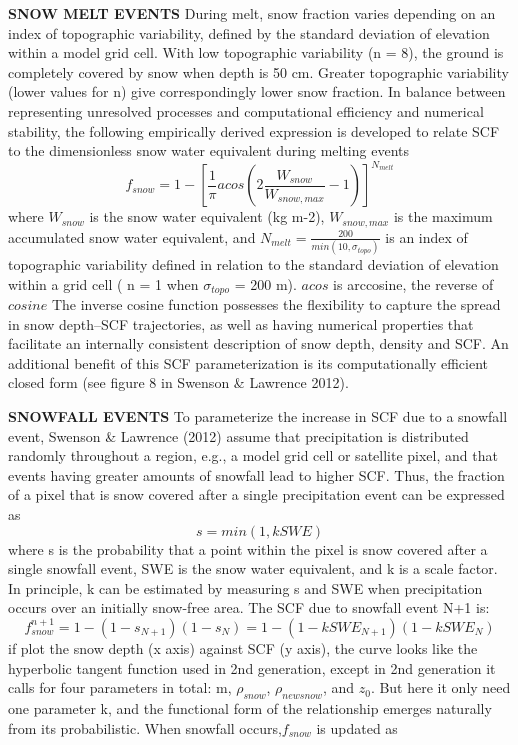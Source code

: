 \documentclass[twoside,10pt]{report}
\begin{document}
\textbf{SNOW MELT EVENTS}
During melt, snow fraction varies depending on an index of topographic variability, defined by the standard deviation of elevation within a model grid cell. With low topographic variability (n = 8), the ground is completely covered by snow when depth is 50 cm. Greater topographic variability (lower values for n) give correspondingly lower snow fraction.
In balance between representing unresolved processes and computational efficiency and numerical stability, the following empirically derived expression is developed to relate SCF to the dimensionless snow water equivalent during melting events
\begin{equation}
f_{snow}=1 - [ \frac{1}{\pi} acos (2\frac{W_{snow}}{W_{snow,max}}  - 1) ]^{N_{melt}} 
\end{equation}
where $W_{snow}$ is the snow water equivalent (kg m-2), $W_{snow,max}$ is the maximum accumulated snow water equivalent, and $N_{melt} = \frac{200}{min(10,\sigma_{topo})}$ is an index of topographic variability defined in relation to the standard deviation of elevation within a grid cell ( n = 1 when $\sigma_{topo}$ = 200 m). $acos$ is arccosine, the reverse of $cosine$ 
The inverse cosine function possesses the flexibility to capture the spread in snow depth–SCF trajectories, as well as having numerical properties that facilitate an internally consistent description of snow depth, density and SCF. An additional benefit of this SCF parameterization is its computationally efficient closed form (see figure 8 in Swenson \& Lawrence 2012).

\textbf{SNOWFALL EVENTS}
To parameterize the increase in SCF due to a snowfall event, Swenson \& Lawrence (2012) assume that precipitation is distributed randomly throughout a region, e.g., a model grid cell or satellite pixel, and that events having greater amounts of snowfall lead to higher SCF. Thus, the fraction of a pixel that is snow covered after a single precipitation event can be expressed as
\begin{equation}
s = min(1,kSWE)
\end{equation}where s is the probability that a point within the pixel is snow covered after a single snowfall event, SWE is the snow water equivalent, and k is a scale factor. In principle, k can be estimated by measuring s and SWE when precipitation occurs over an initially snow-free area. The SCF due to snowfall event N+1 is:
\begin{equation}
f_{snow}^{n+1} = 1-(1-s_{N+1})(1-s_{N}) = 1-(1-kSWE_{N+1})(1-kSWE_{N})
\end{equation}if plot the snow depth (x axis) against SCF (y axis), the curve looks like the hyperbolic tangent function used in 2nd generation, except in 2nd generation it calls for four parameters in total: m, $\rho_{snow}$, $\rho_{newsnow}$, and $z_0$. But here it only need one parameter k, and the functional form of the relationship emerges naturally from its probabilistic. 
When snowfall occurs,$f_{snow}$ is updated as
\end{document}
